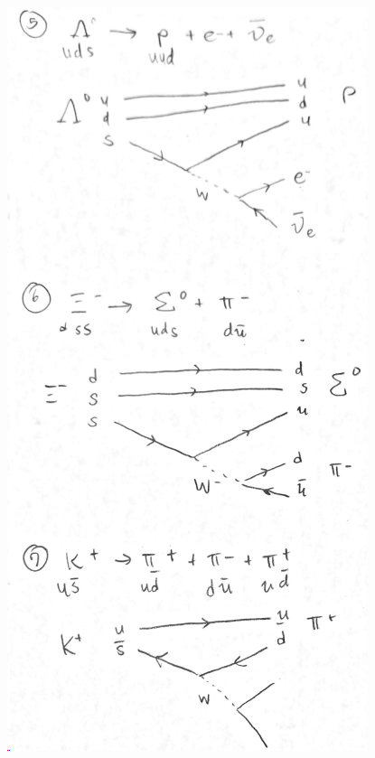 \documentclass{homework}
\begin{document}
\begin{enumerate}
\begin{enumerate}
\begin{minipage}{0.5\textwidth}
			\includegraphics[width=\linewidth]{prob8a2}
			
		\end{minipage}
			

\end{enumerate}
\end{enumerate}
\end{document}
